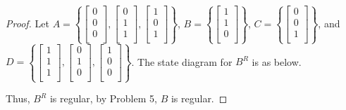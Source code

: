\documentclass[12pt]{article}
\newenvironment{problem}[2][Problem]{\begin{trivlist}
\item[\hskip \labelsep {\bfseries #1}\hskip \labelsep {\bfseries #2.}]}{\end{trivlist}}
\begin{document}
\begin{paragraph}
\newline
\end{paragraph}


\begin{problem}{6}
\end{problem}
\begin{proof}
	\par Let $A = \left\{\begin{bmatrix} 0 \\ 0 \\ 0 \\ \end{bmatrix}, \begin{bmatrix} 0 \\ 1 \\ 1 \\ \end{bmatrix}, \begin{bmatrix} 1 \\ 0 \\ 1 \\ \end{bmatrix}\right\}$, $B = \left\{\begin{bmatrix} 1 \\ 1 \\ 0 \\ \end{bmatrix}\right\}$, $C = \left\{\begin{bmatrix} 0 \\ 0 \\ 1 \\ \end{bmatrix}\right\}$, and $D = \left\{\begin{bmatrix} 1 \\ 1 \\ 1 \\ \end{bmatrix}, \begin{bmatrix} 0 \\ 1 \\ 0 \\ \end{bmatrix}, \begin{bmatrix} 1 \\ 0 \\ 0 \\ \end{bmatrix}\right\}$. The state diagram for $B^R$ is as below. \\
	\begin{center}
        \end{center}
        \par Thus, $B^R$ is regular, by Problem 5, $B$ is regular.
\end{proof}
\end{document}
